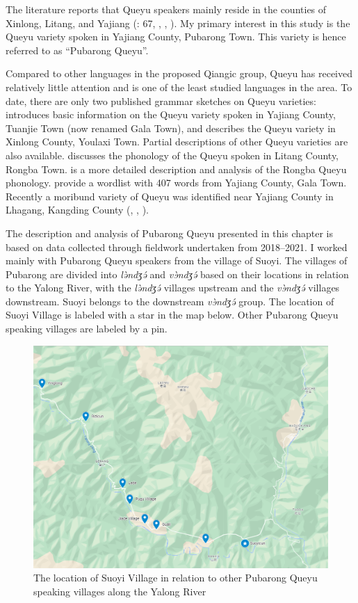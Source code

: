 \documentclass[output=paper]{langscibook}
\begin{document}
  The literature reports that Queyu speakers mainly reside in the counties of Xinlong, Litang, and Yajiang (\citealt{Lu1985}: 67, \citealt[46]{Wang1991}, \citealt[159]{Sun2001}, \citealt[77]{Nishida2008}). My primary interest in this study is the Queyu variety spoken in Yajiang County, Pubarong Town. This variety is hence referred to as “Pubarong Queyu”.  

Compared to other languages in the proposed Qiangic group, Queyu has received relatively little attention and is one of the least studied languages in the area. To date, there are only two published grammar sketches on Queyu varieties: \citet{Lu1985} introduces basic information on the Queyu variety spoken in Yajiang County, Tuanjie Town (now renamed Gala Town), and \citet{Wang1991} describes the Queyu variety in Xinlong County, Youlaxi Town. Partial descriptions of other Queyu varieties are also available. \citet{Nishida2008} discusses the phonology of the Queyu spoken in Litang County, Rongba Town. \citet{Zheng2023} is a more detailed description and analysis of the Rongba Queyu phonology. \citet{NaganoPrins2013} provide a wordlist with 407 words from Yajiang County, Gala Town. Recently a moribund variety of Queyu was identified near Yajiang County in Lhagang, Kangding County (\citealt{SuzukiWangmo2016}, \citealt{SuzukiWangmo2018}, \citealt{SuzukiWangmo2019}).

The description and analysis of Pubarong Queyu presented in this chapter is based on data collected through fieldwork undertaken from 2018--2021. I worked mainly with Pubarong Queyu speakers from the village of Suoyi. The villages of Pubarong are divided into \textit{lə̀ndʒə́} and \textit{vɘ̀ndʒə́} based on their locations in relation to the Yalong River, with the \textit{lə̀ndʒə́} villages upstream and the \textit{vɘ̀ndʒə́} villages downstream. Suoyi belongs to the downstream \textit{vɘ̀ndʒə́} group. The location of Suoyi Village is labeled with a star in the map below. Other Pubarong Queyu speaking villages are labeled by a pin.

 
\begin{figure}
\includegraphics[width=\textwidth]{figures/Guan-img001.png}
\caption{The location of Suoyi Village in relation to other Pubarong Queyu speaking villages along the Yalong River} 
\label{fig:guan:1}
\end{figure}
\end{document}
